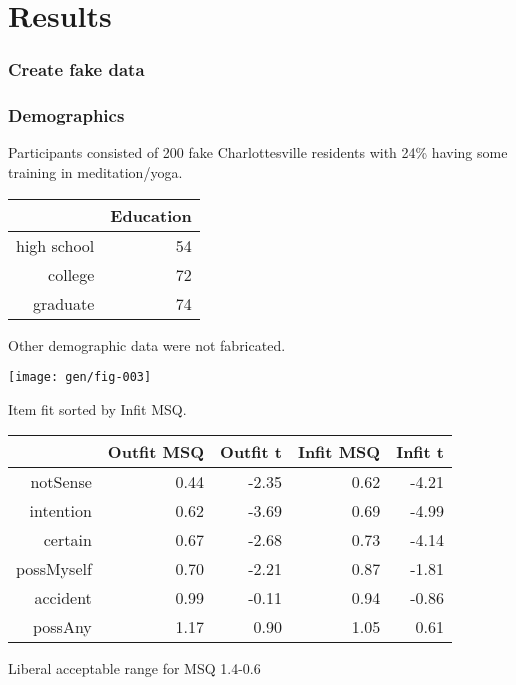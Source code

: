 \documentclass[10pt,utf8x]{beamer}
\begin{document}
\section{Results}
\begin{frame}
  \frametitle{Create fake data}

\end{frame}

\begin{frame}
\frametitle{Demographics}
Participants consisted of 200 fake
Charlottesville residents with
24\%
 having some training in meditation/yoga.

\begin{table}[ht]
\begin{center}
\begin{tabular}{rr}
  \hline
 & Education \\ 
  \hline
high school &  54 \\ 
  college &  72 \\ 
  graduate &  74 \\ 
   \hline
\end{tabular}
\end{center}
\end{table}
Other demographic data were not fabricated.
\end{frame}

\begin{frame}
\texttt{[image: gen/fig-003]}
\end{frame}

\begin{frame}
Item fit sorted by Infit MSQ.
\begin{table}[ht]
\begin{center}
\begin{tabular}{rrrrr}
  \hline
 & Outfit MSQ & Outfit t & Infit MSQ & Infit t \\ 
  \hline
notSense & 0.44 & -2.35 & 0.62 & -4.21 \\ 
  intention & 0.62 & -3.69 & 0.69 & -4.99 \\ 
  certain & 0.67 & -2.68 & 0.73 & -4.14 \\ 
  possMyself & 0.70 & -2.21 & 0.87 & -1.81 \\ 
  accident & 0.99 & -0.11 & 0.94 & -0.86 \\ 
  possAny & 1.17 & 0.90 & 1.05 & 0.61 \\ 
   \hline
\end{tabular}
\end{center}
\end{table}
Liberal acceptable range for MSQ 1.4-0.6
\end{frame}
\end{document}

